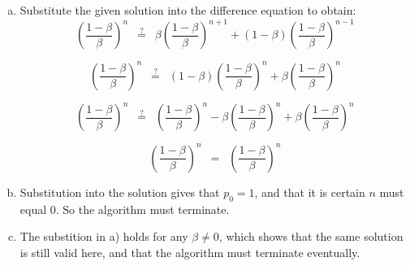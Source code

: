 \documentclass{article}
\begin{document}
\section{}
\begin{enumerate}[a)]
\item
Substitute the given solution into the difference equation to obtain:
\[
\left(\frac{1-\beta}{\beta}\right)^n \hspace{6pt} \stackrel{?}{=} \hspace{6pt}
\beta \left(\frac{1-\beta}{\beta}\right)^{n+1} + (1-\beta)
\left(\frac{1-\beta}{\beta}\right)^{n-1} 
\]

\[
\left(\frac{1-\beta}{\beta}\right)^n \hspace{6pt} \stackrel{?}{=} \hspace{6pt}
(1-\beta)\left(\frac{1-\beta}{\beta}\right)^{n} + 
\beta \left(\frac{1-\beta}{\beta}\right)^{n}
\]

\[
\left(\frac{1-\beta}{\beta}\right)^n \hspace{6pt} \stackrel{?}{=} \hspace{6pt}
\left(\frac{1-\beta}{\beta}\right)^{n} -
\beta \left(\frac{1-\beta}{\beta}\right)^{n} +
\beta \left(\frac{1-\beta}{\beta}\right)^{n}
\]

\[
\left(\frac{1-\beta}{\beta}\right)^n \hspace{6pt} = \hspace{6pt}
\left(\frac{1-\beta}{\beta}\right)^n
\]

\item
Substitution into the solution gives that $p_0 = 1$, and that it is certain $n$
must equal 0. So the algorithm must terminate.

\item
The substition in a) holds for any $\beta \ne 0$, which shows that the
same solution is still valid here, and that the algorithm must terminate
eventually.

\end{enumerate}
\end{document}
